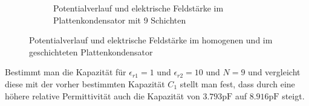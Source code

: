 \begin{figure}[h]
\begin{subfigure}[c]{0.35\textwidth}
		\caption{Potentialverlauf und elektrische Feldstärke im Plattenkondensator mit 9 Schichten}
		\label{fig:N9_EFeld}
\end{subfigure}
	\caption{Potentialverlauf und elektrische Feldstärke im homogenen und im geschichteten Plattenkondensator}
\end{figure}

Bestimmt man die Kapazität für $\epsilon_{r1} = 1$ und $\epsilon_{r2} = 10$ und $N = 9$ und vergleicht diese mit der vorher bestimmten Kapazität $C_1$ stellt man fest, dass durch eine höhere relative Permittivität auch die Kapazität von $\num{3,793}\si{\pico\farad}$ auf $\num{8,916}\si{\pico\farad}$ steigt.

